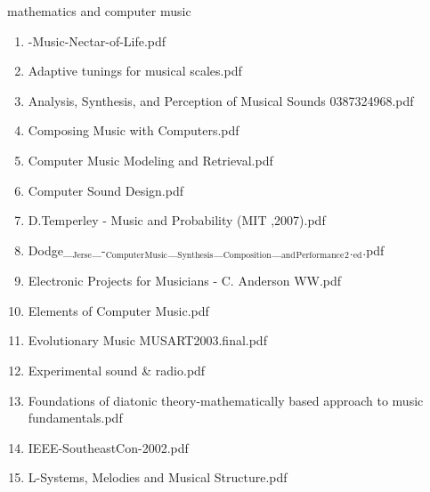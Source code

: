 \documentclass[11pt]{article}
\begin{document}
\item mathematics and computer music
\label{sec-1-1-1-1-11-19-25}
\begin{enumerate}
\item -Music-Nectar-of-Life.pdf
\label{sec-1-1-1-1-11-19-25-1}

\item Adaptive tunings for musical scales.pdf
\label{sec-1-1-1-1-11-19-25-2}

\item Analysis, Synthesis, and Perception of Musical Sounds 0387324968.pdf
\label{sec-1-1-1-1-11-19-25-3}

\item Composing Music with Computers.pdf
\label{sec-1-1-1-1-11-19-25-4}

\item Computer Music Modeling and Retrieval.pdf
\label{sec-1-1-1-1-11-19-25-5}

\item Computer Sound Design.pdf
\label{sec-1-1-1-1-11-19-25-6}

\item D.Temperley - Music and Probability (MIT ,2007).pdf
\label{sec-1-1-1-1-11-19-25-7}

\item Dodge\_$_{\text{Jerse}}$\_-$_{\text{Computer}}$$_{\text{Music}}$\_$_{\text{Synthesis}}$\_$_{\text{Composition}}$\_$_{\text{and}}$$_{\text{Performance}}$$_{\text{2}}$.$_{\text{ed}}$.pdf
\label{sec-1-1-1-1-11-19-25-8}

\item Electronic Projects for Musicians - C. Anderson WW.pdf
\label{sec-1-1-1-1-11-19-25-9}

\item Elements of Computer Music.pdf
\label{sec-1-1-1-1-11-19-25-10}

\item Evolutionary Music MUSART2003.final.pdf
\label{sec-1-1-1-1-11-19-25-11}

\item Experimental sound \& radio.pdf
\label{sec-1-1-1-1-11-19-25-12}

\item Foundations of diatonic theory-mathematically based approach to music fundamentals.pdf
\label{sec-1-1-1-1-11-19-25-13}

\item IEEE-SoutheastCon-2002.pdf
\label{sec-1-1-1-1-11-19-25-14}

\item L-Systems, Melodies and Musical Structure.pdf
\label{sec-1-1-1-1-11-19-25-15}


\end{enumerate}
\end{document}
